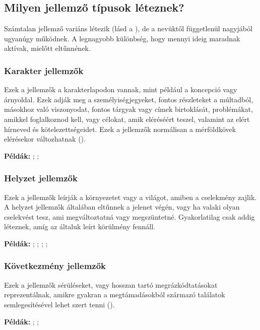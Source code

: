 \subsection{Milyen jellemző típusok léteznek?}

Számtalan jellemző variáns létezik (lásd a ), de a nevüktől függetlenül nagyjából ugyanúgy működnek. A legnagyobb különbség, hogy mennyi ideig maradnak aktívak, mielőtt eltűnnének.

\subsubsection{Karakter jellemzők}

Ezek a jellemzők a karakterlapodon vannak, mint például a koncepció vagy árnyoldal. Ezek adják meg a személyiségjegyeket, fontos részleteket a múltadból, másokhoz való viszonyodat, fontos tárgyak vagy címek birtoklását, problémákat, amikkel foglalkoznod kell, vagy célokat, amik eléréséért teszel, valamint az elért hírneved és kötelezettségeidet. Ezek a jellemzők normálisan a mérföldkövek elérésekor változhatnak ().

\textbf{Példák:} ; ; 

\subsubsection{Helyzet jellemzők}

Ezek a jellemzők leírják a környezetet vagy a világot, amiben a cselekmény zajlik. A helyzet jellemzők általában eltűnnek a jelenet végén, vagy ha valaki olyan cselekvést tesz, ami megváltoztatná vagy megszüntetné. Gyakorlatilag csak addig léteznek, amíg az általuk leírt körülmény fennáll.

\textbf{Példák:} ; ; ; ; 

\subsubsection{Következmény jellemzők}

Ezek a jellemzők sérüléseket, vagy hosszan tartó megrázkódtatásokat reprezentálnak, amikre gyakran a megtámadásokból származó találatok semlegesítésével lehet szert tenni ().

\textbf{Példák:} ; ; 

